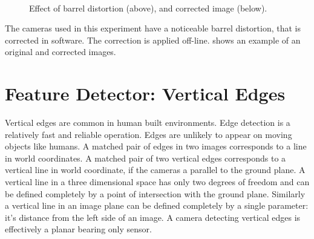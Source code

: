 \begin{figure}[htbp]
  \centering
{}\\

  \caption{Effect of barrel distortion (above), and corrected image (below).}
  \label{fig:barrel_distortion}
\end{figure}

The cameras used in this experiment have a noticeable barrel
distortion, that is corrected in software. The correction is applied
off-line.  shows an example of an
original and corrected images.


\section{Feature Detector: Vertical Edges}

Vertical edges are common in human built environments. Edge detection
is a relatively fast and reliable operation. Edges are unlikely to
appear on moving objects like humans. A matched pair of edges in two
images corresponds to a line in world coordinates. A matched pair
of two vertical edges corresponds to a vertical line in world
coordinate, if the cameras a parallel to the ground plane. A vertical
line in a three dimensional space has only two degrees of freedom and
can be defined completely by a point of intersection with the ground
plane. Similarly a vertical line in an image plane can be defined
completely by a single parameter: it's distance from the left side of
an image. A camera detecting vertical edges is effectively a planar
bearing only sensor. 

